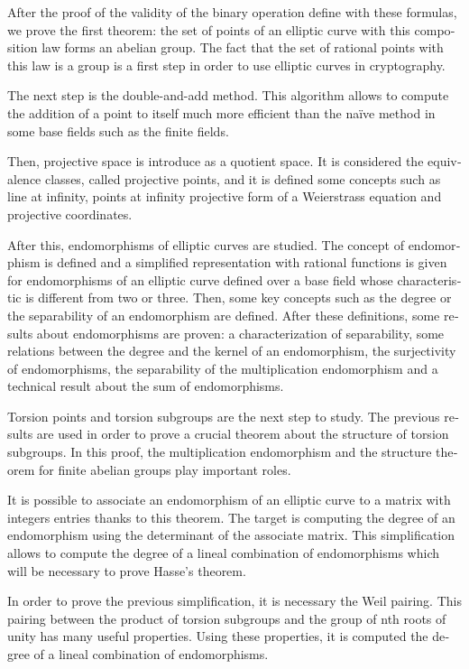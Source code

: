 \begin{otherlanguage}{american}
After the proof of the validity of the binary operation define with these formulas, we prove the first theorem: the set of points of an elliptic curve with this composition law forms an abelian group. The fact that the set of rational points with this law is a group is a first step in order to use elliptic curves in cryptography.

The next step is the double-and-add method. This algorithm allows to compute the addition of a point to itself much more efficient than the naïve method in some base fields such as the finite fields.

Then, projective space is introduce as a quotient space. It is considered the equivalence classes, called projective points, and it is defined some concepts such as line at infinity, points at infinity projective form of a Weierstrass equation and projective coordinates.

After this, endomorphisms of elliptic curves are studied. The concept of endomorphism is defined and a simplified representation with rational functions is given for endomorphisms of an elliptic curve defined over a base field whose characteristic is different from two or three. Then, some key concepts such as the degree or the separability of an endomorphism are defined. After these definitions, some results about endomorphisms are proven: a characterization of separability, some relations between the degree and the kernel of an endomorphism,  the surjectivity of endomorphisms, the separability of the multiplication endomorphism and a technical result about the sum of endomorphisms.

Torsion points and torsion subgroups are the next step to study. The previous results are used in order to prove a crucial theorem about the structure of torsion subgroups. In this proof, the multiplication endomorphism and the structure theorem for finite abelian groups play important roles.

It is possible to associate an endomorphism of an elliptic curve to a matrix with integers entries thanks to this theorem. The target is computing the degree of an endomorphism using the determinant of the associate matrix. This simplification allows to compute the degree of a lineal combination of endomorphisms which will be necessary to prove Hasse's theorem.

In order to prove the previous simplification, it is necessary the Weil pairing. This pairing between the product of torsion subgroups and the group of nth roots of unity has many useful properties. Using these properties, it is computed the degree of a lineal combination of endomorphisms.


\end{otherlanguage}
